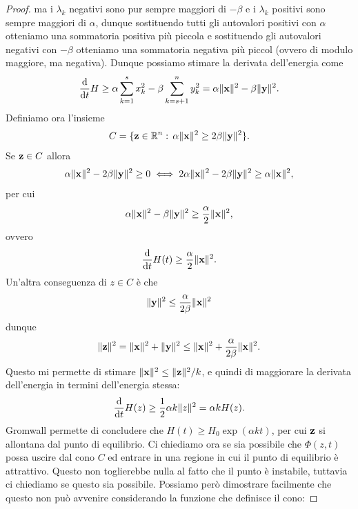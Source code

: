 \begin{proof}
    ma i $\lambda_k$ negativi sono pur sempre maggiori di $-\beta$ e i $\lambda_k$ positivi sono sempre maggiori di $\alpha$, dunque sostituendo tutti gli autovalori positivi con $\alpha$ otteniamo una sommatoria positiva più piccola e sostituendo gli autovalori negativi con $-\beta$ otteniamo una sommatoria negativa più piccol (ovvero di modulo maggiore, ma negativa). Dunque possiamo stimare la derivata dell'energia come
    \begin{equation}
        \frac{\mathrm{d}}{\mathrm{d}t} H \geq \alpha\sum_{k=1}^{s} x^2_k -\beta\sum_{k=s+1}^n y_k^2=\alpha \|\mathbf{x}\|^2-\beta\|\mathbf{y}\|^2.
    \end{equation}
    Definiamo ora l'insieme
    \begin{equation}
    C=\{\mathbf{z} \in \mathbb{R}^{n}:\,\alpha \|\mathbf{x}\|^2\geq 2\beta \|\mathbf{y}\|^2\}.
    \end{equation}
    Se $\mathbf{z}\in C$ allora
    \begin{equation}
        \alpha \|\mathbf{x}\|^2- 2\beta \|\mathbf{y}\|^2\geq0 \iff 2\alpha \|\mathbf{x}\|^2- 2\beta \|\mathbf{y}\|^2\geq\alpha \|\mathbf{x}\|^2,
    \end{equation}
    per cui
    \begin{equation}
        \alpha \|\mathbf{x}\|^2- \beta \|\mathbf{y}\|^2\geq\frac{\alpha}{2} \|\mathbf{x}\|^2,
    \end{equation}
    ovvero
    \begin{equation}
        \frac{\mathrm{d}}{\mathrm{d}t} H(t) \geq \frac{\alpha}{2} \|\mathbf{x}\|^2.
    \end{equation}
    Un'altra conseguenza di $z\in C$ è che
    \begin{equation}
        \|\mathbf{y}\|^2 \leq \frac{\alpha}{2\beta} \|\mathbf{x}\|^2
    \end{equation}
    dunque
    \begin{equation}
        \|\mathbf{z}\|^2 = \|\mathbf{x}\|^2+\|\mathbf{y}\|^2 \leq\|\mathbf{x}\|^2 + \frac{\alpha}{2\beta}\|\mathbf{x}\|^2.
    \end{equation}
    Questo mi permette di stimare $\|\mathbf{x}\|^2 \leq \|\mathbf{z}\|^2/k$, e quindi di maggiorare la derivata dell'energia in termini dell'energia stessa:
    \begin{equation}
        \frac{\mathrm{d}}{\mathrm{d}t} H(z) \geq \frac{1}{2}\alpha k \|z\|^2 = \alpha k H(z).
    \end{equation}
    Gromwall permette di concludere che $H(t)\geq H_0 \exp(\alpha k t)$, per cui $\mathbf{z}$ si allontana dal punto di equilibrio.
    Ci chiediamo ora se sia possibile che $\Phi(z,t)$ possa uscire dal cono $C$ ed entrare in una regione in cui il punto di equilibrio è attrattivo. Questo non toglierebbe nulla al fatto che il punto è instabile, tuttavia ci chiediamo se questo sia possibile. Possiamo però dimostrare facilmente che questo non può avvenire considerando la funzione che definisce il cono:

\end{proof}

